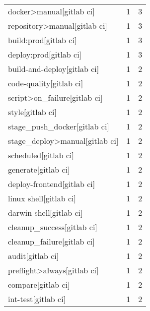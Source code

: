 \begin{tabular}{lrr}
docker>manual[gitlab ci]                   &                   1 &             3 \\
repository>manual[gitlab ci]               &                   1 &             3 \\
build:prod[gitlab ci]                      &                   1 &             3 \\
deploy:prod[gitlab ci]                     &                   1 &             3 \\
build-and-deploy[gitlab ci]                &                   1 &             2 \\
code-quality[gitlab ci]                    &                   1 &             2 \\
script>on\_failure[gitlab ci]               &                   1 &             2 \\
style[gitlab ci]                           &                   1 &             2 \\
stage\_push\_docker[gitlab ci]               &                   1 &             2 \\
stage\_deploy>manual[gitlab ci]             &                   1 &             2 \\
scheduled[gitlab ci]                       &                   1 &             2 \\
generate[gitlab ci]                        &                   1 &             2 \\
deploy-frontend[gitlab ci]                 &                   1 &             2 \\
linux shell[gitlab ci]                     &                   1 &             2 \\
darwin shell[gitlab ci]                    &                   1 &             2 \\
cleanup\_success[gitlab ci]                 &                   1 &             2 \\
cleanup\_failure[gitlab ci]                 &                   1 &             2 \\
audit[gitlab ci]                           &                   1 &             2 \\
preflight>always[gitlab ci]                &                   1 &             2 \\
compare[gitlab ci]                         &                   1 &             2 \\
int-test[gitlab ci]                        &                   1 &             2 \\

\end{tabular}
